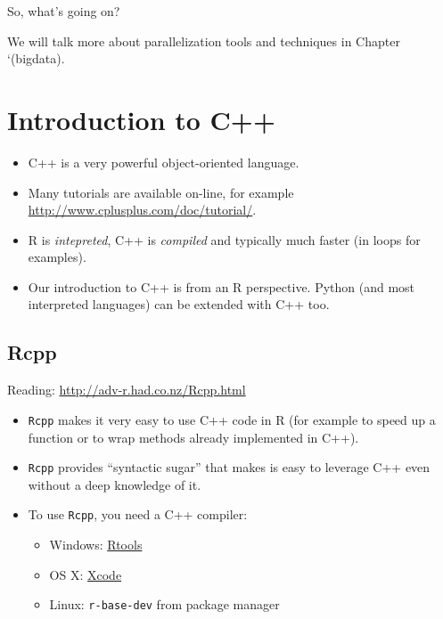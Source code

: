 \documentclass[]{book}
\providecommand{\tightlist}{%
  \setlength{\itemsep}{0pt}\setlength{\parskip}{0pt}}
\theoremstyle{definition}
\theoremstyle{definition}
\theoremstyle{definition}
\theoremstyle{remark}
\begin{document}
So, what's going on?

We will talk more about parallelization tools and techniques in Chapter
`\citet{ref}(bigdata).

\section{Introduction to C++}\label{introduction-to-c}

\begin{itemize}
\item
  C++ is a very powerful object-oriented language.
\item
  Many tutorials are available on-line, for example
  \url{http://www.cplusplus.com/doc/tutorial/}.
\item
  R is \emph{intepreted}, C++ is \emph{compiled} and typically much
  faster (in loops for examples).
\item
  Our introduction to C++ is from an R perspective. Python (and most
  interpreted languages) can be extended with C++ too.
\end{itemize}

\subsection{Rcpp}\label{rcpp}

Reading: \url{http://adv-r.had.co.nz/Rcpp.html}

\begin{itemize}
\item
  \texttt{Rcpp} \citet{Eddelbuettel2013} makes it very easy to use C++
  code in R (for example to speed up a function or to wrap methods
  already implemented in C++).
\item
  \texttt{Rcpp} provides ``syntactic sugar'' that makes is easy to
  leverage C++ even without a deep knowledge of it.
\item
  To use \texttt{Rcpp}, you need a C++ compiler:

  \begin{itemize}
  \tightlist
  \item
    Windows:
    \href{https://cran.r-project.org/bin/windows/Rtools/}{Rtools}
  \item
    OS X: \href{https://developer.apple.com/xcode/}{Xcode}
  \item
    Linux: \texttt{r-base-dev} from package manager
  \end{itemize}
\end{itemize}
\end{document}

